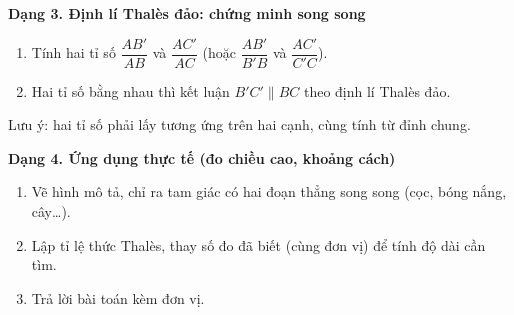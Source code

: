 \textbf{Dạng 3. Định lí Thalès đảo: chứng minh song song}
\begin{enumerate}
\item Tính hai tỉ số $\dfrac{AB'}{AB}$ và $\dfrac{AC'}{AC}$ (hoặc $\dfrac{AB'}{B'B}$ và $\dfrac{AC'}{C'C}$).
\item Hai tỉ số bằng nhau thì kết luận $B'C'\parallel BC$ theo định lí Thalès đảo.
\end{enumerate}
Lưu ý: hai tỉ số phải lấy tương ứng trên hai cạnh, cùng tính từ đỉnh chung.

\textbf{Dạng 4. Ứng dụng thực tế (đo chiều cao, khoảng cách)}
\begin{enumerate}
\item Vẽ hình mô tả, chỉ ra tam giác có hai đoạn thẳng song song (cọc, bóng nắng, cây\dots).
\item Lập tỉ lệ thức Thalès, thay số đo đã biết (cùng đơn vị) để tính độ dài cần tìm.
\item Trả lời bài toán kèm đơn vị.
\end{enumerate}
